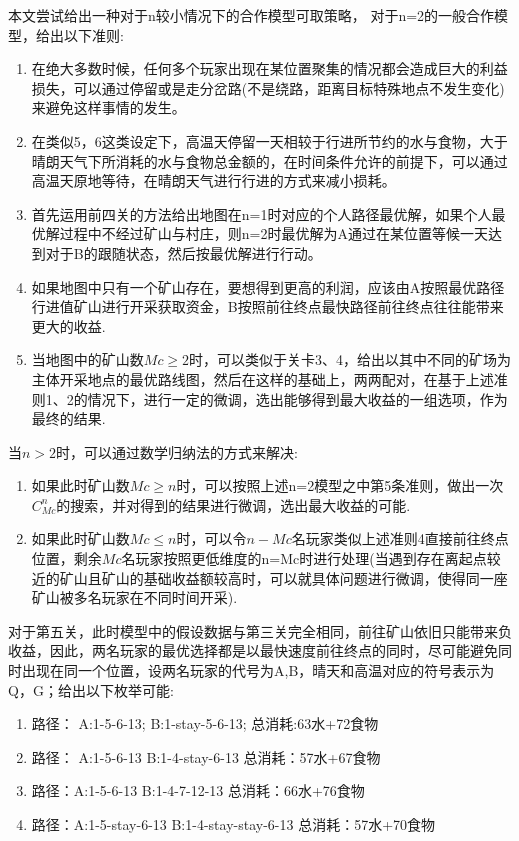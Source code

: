 \documentclass[a4paper]{ctexart}
\begin{document}
本文尝试给出一种对于n较小情况下的合作模型可取策略，
对于n=2的一般合作模型，给出以下准则:

\begin{enumerate}
    \item 在绝大多数时候，任何多个玩家出现在某位置聚集的情况都会造成巨大的利益损失，可以通过停留或是走分岔路(不是绕路，距离目标特殊地点不发生变化)来避免这样事情的发生。
    \item 在类似5，6这类设定下，高温天停留一天相较于行进所节约的水与食物，大于晴朗天气下所消耗的水与食物总金额的，在时间条件允许的前提下，可以通过高温天原地等待，在晴朗天气进行行进的方式来减小损耗。
    \item 首先运用前四关的方法给出地图在n=1时对应的个人路径最优解，如果个人最优解过程中不经过矿山与村庄，则n=2时最优解为A通过在某位置等候一天达到对于B的跟随状态，然后按最优解进行行动。
    \item 如果地图中只有一个矿山存在，要想得到更高的利润，应该由A按照最优路径行进值矿山进行开采获取资金，B按照前往终点最快路径前往终点往往能带来更大的收益.
    \item 当地图中的矿山数$Mc\geq 2$时，可以类似于关卡3、4，给出以其中不同的矿场为主体开采地点的最优路线图，然后在这样的基础上，两两配对，在基于上述准则1、2的情况下，进行一定的微调，选出能够得到最大收益的一组选项，作为最终的结果.
\end{enumerate}

当$n>2$时，可以通过数学归纳法的方式来解决:

\begin{enumerate}
    \item 如果此时矿山数$Mc\geq n$时，可以按照上述n=2模型之中第5条准则，做出一次$C_{Mc}^{n}$的搜索，并对得到的结果进行微调，选出最大收益的可能.
    \item 如果此时矿山数$Mc\leq n$时，可以令$n-Mc$名玩家类似上述准则4直接前往终点位置，剩余$Mc$名玩家按照更低维度的n=Mc时进行处理(当遇到存在离起点较近的矿山且矿山的基础收益额较高时，可以就具体问题进行微调，使得同一座矿山被多名玩家在不同时间开采).
\end{enumerate}

对于第五关，此时模型中的假设数据与第三关完全相同，前往矿山依旧只能带来负收益，因此，两名玩家的最优选择都是以最快速度前往终点的同时，尽可能避免同时出现在同一个位置，设两名玩家的代号为A,B，晴天和高温对应的符号表示为Q，G；给出以下枚举可能:

\begin{enumerate}
    \item 路径： A:1-5-6-13; B:1-stay-5-6-13;
          总消耗:63水+72食物
    \item 路径： A:1-5-6-13 B:1-4-stay-6-13
         总消耗：57水+67食物
    \item  路径：A:1-5-6-13 B:1-4-7-12-13
        总消耗：66水+76食物
    \item 路径：A:1-5-stay-6-13 B:1-4-stay-stay-6-13
         总消耗：57水+70食物
\end{enumerate}
\end{document}
